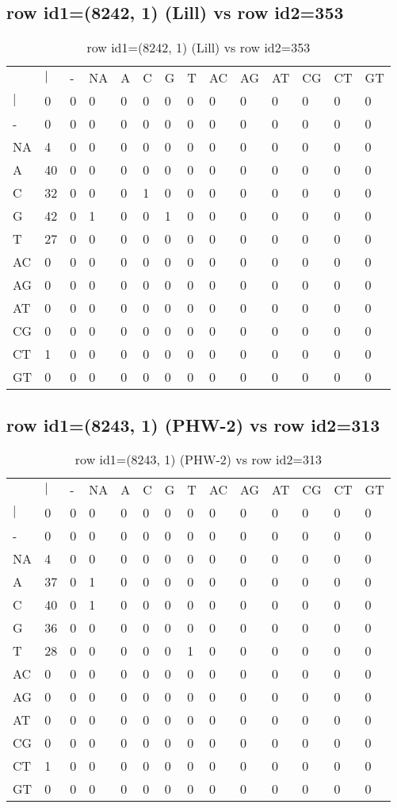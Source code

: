 \subsection{row id1=(8242, 1) (Lill) vs row id2=353}
\begin{center}
\begin{longtable}{|l|l|l|l|l|l|l|l|l|l|l|l|l|l|}
\caption{row id1=(8242, 1) (Lill) vs row id2=353} \label{table_dm174}\\
\hline
\\
\hline
&$|$&-&NA&A&C&G&T&AC&AG&AT&CG&CT&GT\\
$|$&0&0&0&0&0&0&0&0&0&0&0&0&0\\
-&0&0&0&0&0&0&0&0&0&0&0&0&0\\
NA&4&0&0&0&0&0&0&0&0&0&0&0&0\\
A&40&0&0&0&0&0&0&0&0&0&0&0&0\\
C&32&0&0&0&1&0&0&0&0&0&0&0&0\\
G&42&0&1&0&0&1&0&0&0&0&0&0&0\\
T&27&0&0&0&0&0&0&0&0&0&0&0&0\\
AC&0&0&0&0&0&0&0&0&0&0&0&0&0\\
AG&0&0&0&0&0&0&0&0&0&0&0&0&0\\
AT&0&0&0&0&0&0&0&0&0&0&0&0&0\\
CG&0&0&0&0&0&0&0&0&0&0&0&0&0\\
CT&1&0&0&0&0&0&0&0&0&0&0&0&0\\
GT&0&0&0&0&0&0&0&0&0&0&0&0&0\\
\hline
\end{longtable}
\end{center}

\subsection{row id1=(8243, 1) (PHW-2) vs row id2=313}
\begin{center}
\begin{longtable}{|l|l|l|l|l|l|l|l|l|l|l|l|l|l|}
\caption{row id1=(8243, 1) (PHW-2) vs row id2=313} \label{table_dm176}\\
\hline
\\
\hline
&$|$&-&NA&A&C&G&T&AC&AG&AT&CG&CT&GT\\
$|$&0&0&0&0&0&0&0&0&0&0&0&0&0\\
-&0&0&0&0&0&0&0&0&0&0&0&0&0\\
NA&4&0&0&0&0&0&0&0&0&0&0&0&0\\
A&37&0&1&0&0&0&0&0&0&0&0&0&0\\
C&40&0&1&0&0&0&0&0&0&0&0&0&0\\
G&36&0&0&0&0&0&0&0&0&0&0&0&0\\
T&28&0&0&0&0&0&1&0&0&0&0&0&0\\
AC&0&0&0&0&0&0&0&0&0&0&0&0&0\\
AG&0&0&0&0&0&0&0&0&0&0&0&0&0\\
AT&0&0&0&0&0&0&0&0&0&0&0&0&0\\
CG&0&0&0&0&0&0&0&0&0&0&0&0&0\\
CT&1&0&0&0&0&0&0&0&0&0&0&0&0\\
GT&0&0&0&0&0&0&0&0&0&0&0&0&0\\
\hline
\end{longtable}
\end{center}

